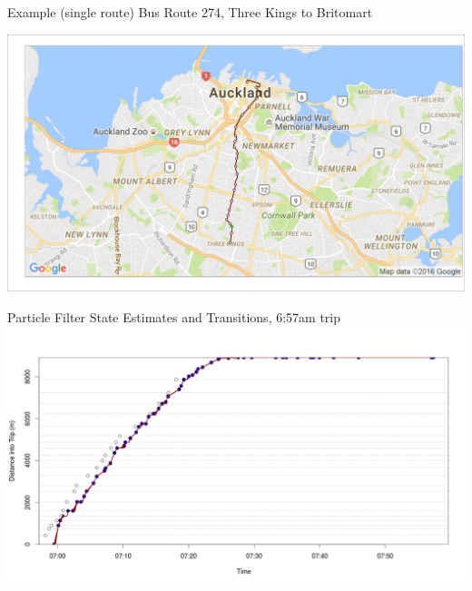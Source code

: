 \documentclass[10pt,t]{beamer}
\begin{document}
\begin{frame}{Example (single route)}
  Bus Route 274, Three Kings to Britomart


  \begin{overprint}
    \centering
    \includegraphics[width=1\textwidth,trim={2mm 2mm 2mm 2mm},clip]{figs/r274/TRIP5_particle_map001.png}

    \vspace{2em}
    Particle Filter State Estimates and Transitions, 6:57am trip
    \centering
    \includegraphics[width=1\textwidth]{figs/r274/TRIP5_distance_traveled.png}


\end{overprint}
\end{frame}
\end{document}
